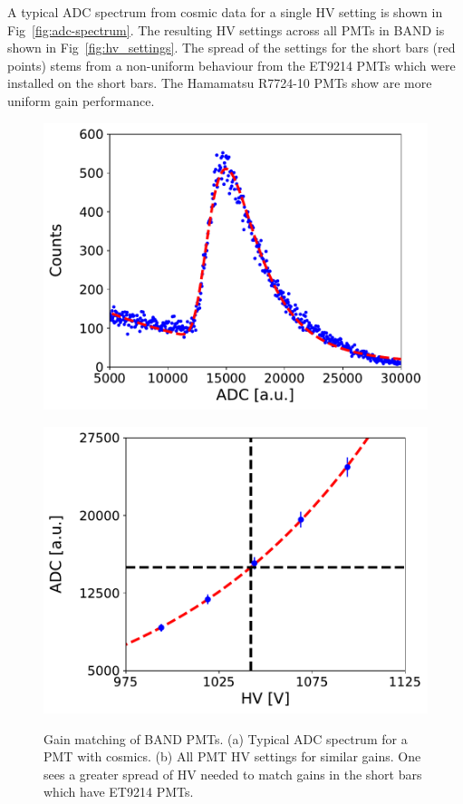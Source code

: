 \documentclass[3p,final,twocolumn]{elsarticle}
\begin{document}
A typical ADC spectrum from cosmic data for a single HV setting %
is shown in Fig~\ref{fig:adc-spectrum}. The resulting HV settings across all PMTs in BAND is 
shown in Fig~\ref{fig:hv_settings}. The spread of the settings for the short bars (red points) stems from a non-uniform behaviour from the ET9214 PMTs which were installed on the short bars. The Hamamatsu R7724-10 PMTs show are more uniform gain performance.
\begin{figure}[th!]
	\centering
		\begin{minipage}{0.48\textwidth}
			\includegraphics[width=\textwidth]{adc-fit-example.pdf}\\
					\subcaption{}
			\label{fig:adc-spectrum}
		\end{minipage}
		\begin{minipage}{0.48\textwidth}
			\includegraphics[width=\textwidth]{gainfit.pdf}
			\subcaption{}
		\label{fig:gain-curve}
		\end{minipage}
		\caption{Gain matching of BAND PMTs. (a) Typical ADC spectrum for a PMT with cosmics. (b) All PMT HV settings for similar gains. One sees a greater 
		spread of HV needed to match gains in the short bars which have ET9214 PMTs.}
\end{figure}
\end{document}
